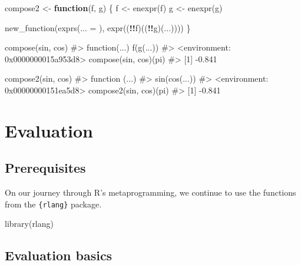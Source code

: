 \documentclass[
]{krantz}
\makeatletter
\newenvironment{Shaded}{\begin{snugshade}}{\end{snugshade}}
\newcommand{\CommentTok}[1]{\textcolor[rgb]{0.56,0.35,0.01}{\textit{#1}}}
\newcommand{\ControlFlowTok}[1]{\textcolor[rgb]{0.13,0.29,0.53}{\textbf{#1}}}
\newcommand{\DataTypeTok}[1]{\textcolor[rgb]{0.13,0.29,0.53}{#1}}
\newcommand{\KeywordTok}[1]{\textcolor[rgb]{0.13,0.29,0.53}{\textbf{#1}}}
\newcommand{\NormalTok}[1]{#1}
\newcommand{\OperatorTok}[1]{\textcolor[rgb]{0.81,0.36,0.00}{\textbf{#1}}}
\newcommand{\StringTok}[1]{\textcolor[rgb]{0.31,0.60,0.02}{#1}}
\newenvironment{kframe}{%
\medskip{}
\setlength{\fboxsep}{.8em}
 \def\at@end@of@kframe{}%
 \ifinner\ifhmode%
  \def\at@end@of@kframe{\end{minipage}}%
  \begin{minipage}{\columnwidth}%
 \fi\fi%
 \def\FrameCommand##1{\hskip\@totalleftmargin \hskip-\fboxsep
 \colorbox{shadecolor}{##1}\hskip-\fboxsep
     \hskip-\linewidth \hskip-\@totalleftmargin \hskip\columnwidth}%
 \MakeFramed {\advance\hsize-\width
   \@totalleftmargin\z@ \linewidth\hsize
   \@setminipage}}%
 {\par\unskip\endMakeFramed%
 \at@end@of@kframe}
\renewenvironment{Shaded}{\begin{kframe}}{\end{kframe}}
\renewcommand{\KeywordTok} [1]{\textcolor[rgb]{0.00,0.44,0.13}{{#1}}}
\renewcommand{\DataTypeTok}[1]{\textcolor[rgb]{0.56,0.13,0.00}{{#1}}}
\renewcommand{\StringTok}  [1]{\textcolor[rgb]{0.25,0.44,0.63}{{#1}}}
\renewcommand{\CommentTok} [1]{\textcolor[rgb]{0.38,0.63,0.69}{{#1}}}
\renewcommand{\NormalTok}  [1]{{#1}}
\makeatother
\begin{document}
\begin{Shaded}
\begin{Highlighting}[]
\NormalTok{compose2 <-}\StringTok{ }\ControlFlowTok{function}\NormalTok{(f, g) \{}
\NormalTok{  f <-}\StringTok{ }\KeywordTok{enexpr}\NormalTok{(f)}
\NormalTok{  g <-}\StringTok{ }\KeywordTok{enexpr}\NormalTok{(g)}
  
  \KeywordTok{new_function}\NormalTok{(}\KeywordTok{exprs}\NormalTok{(}\DataTypeTok{... =}\NormalTok{ ), }\KeywordTok{expr}\NormalTok{((}\OperatorTok{!!}\NormalTok{f)((}\OperatorTok{!!}\NormalTok{g)(...))))}
\NormalTok{\}}

\KeywordTok{compose}\NormalTok{(sin, cos)}
\CommentTok{#> function(...) f(g(...))}
\CommentTok{#> <environment: 0x0000000015a953d8>}
\KeywordTok{compose}\NormalTok{(sin, cos)(pi)}
\CommentTok{#> [1] -0.841}

\KeywordTok{compose2}\NormalTok{(sin, cos)}
\CommentTok{#> function (...) }
\CommentTok{#> sin(cos(...))}
\CommentTok{#> <environment: 0x00000000151ea5d8>}
\KeywordTok{compose2}\NormalTok{(sin, cos)(pi)}
\CommentTok{#> [1] -0.841}
\end{Highlighting}
\end{Shaded}

\hypertarget{evaluation}{%
\chapter{Evaluation}\label{evaluation}}

\hypertarget{prerequisites-11}{%
\section*{Prerequisites}\label{prerequisites-11}}


On our journey through R's metaprogramming, we continue to use the functions from the \texttt{\{rlang\}} package.

\begin{Shaded}
\begin{Highlighting}[]
\KeywordTok{library}\NormalTok{(rlang)}
\end{Highlighting}
\end{Shaded}


\hypertarget{evaluation-basics}{%
\section{Evaluation basics}\label{evaluation-basics}}
\end{document}
